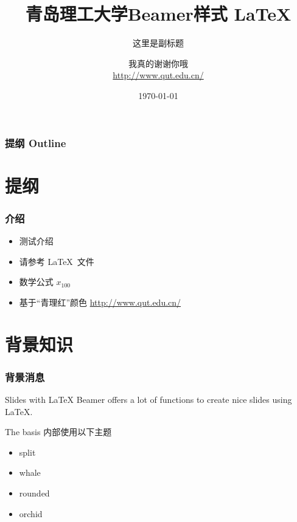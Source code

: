 \documentclass{beamer}
\title[QUT 样式 Beamer]{
  青岛理工大学Beamer样式 \LaTeX}
\subtitle{这里是副标题}
\author[Lev1s]{
  我真的谢谢你哦\\\medskip
  {\small \url{http://www.qut.edu.cn/}}}
\institute[Qingdao University of Technology]{
  理学院 \\ %
  青岛理工大学}
\date{\today}
\begin{document}
\begin{frame}
  \titlepage
\end{frame}

\begin{frame}
  \frametitle{提纲 Outline}

  \tableofcontents
\end{frame}

\section{提纲}

\begin{frame}
  \frametitle{介绍}

  \begin{itemize}
    \item 测试介绍
    \item 请参考 \LaTeX\ 文件
    \item 数学公式 $x_{100}$
    \item 基于“青理红”颜色 \url{http://www.qut.edu.cn/}
  \end{itemize}
\end{frame}

\section{背景知识}

\begin{frame}
  \frametitle{背景消息}

  \begin{block}{Slides with \LaTeX}
    Beamer offers a lot of functions to create nice slides using \LaTeX.
  \end{block}

  \begin{block}{The basis}
    内部使用以下主题
    \begin{itemize}
      \item split
      \item whale
      \item rounded
      \item orchid
    \end{itemize}
  \end{block}
\end{frame}
\end{document}
